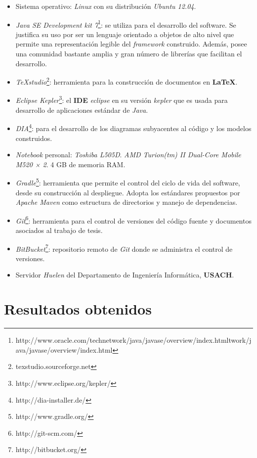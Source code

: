 \begin{itemize}
	\item Sistema operativo: \textit{Linux} con su distribución \textit{Ubuntu 12.04}.
	\item \textit{Java SE Development kit 7}\footnote{http://www.oracle.com/technetwork/java/javase/overview/index.htmltwork/java/javase/overview/index.html}: se utiliza para el desarrollo del software. Se justifica su uso por ser un lenguaje orientado a objetos de alto nivel que permite una representación legible del \textit{framework} construido. Además, posee una comunidad bastante amplia y gran número de librerías que facilitan el desarrollo.
	\item \textit{TeXstudio}\footnote{texstudio.sourceforge.net}: herramienta para la construcción de documentos en \textbf{LaTeX}.
	\item \textit{Eclipse Kepler}\footnote{http://www.eclipse.org/kepler/}: el \textbf{IDE} \textit{eclipse} en su versión \textit{kepler} que es usada para desarrollo de aplicaciones estándar de \textit{Java}.
	\item \textit{DIA}\footnote{http://dia-installer.de/}: para el desarrollo de los diagramas subyacentes al código y los modelos construidos.
	\item \textit{Notebook} personal:\textit{ Toshiba L505D}. \textit{AMD Turion(tm) II Dual-Core Mobile M520 × 2}. 4 GB de memoria RAM.
	\item \textit{Gradle}\footnote{http://www.gradle.org/}: herramienta que permite el control del ciclo de vida del software, desde su construcción al despliegue. Adopta los estándares propuestos por \textit{Apache Maven} como estructura de directorios y manejo de dependencias.
	\item \textit{Git}\footnote{http://git-scm.com/}: herramienta para el control de versiones del código fuente y documentos asociados al trabajo de tesis.
	\item \textit{BitBucket}\footnote{http://bitbucket.org/}: repositorio remoto de \textit{Git} donde se administra el control de versiones.
	\item Servidor \textit{Huelen} del Departamento de Ingeniería Informática, \textbf{USACH}.
\end{itemize}

\section{Resultados obtenidos}

